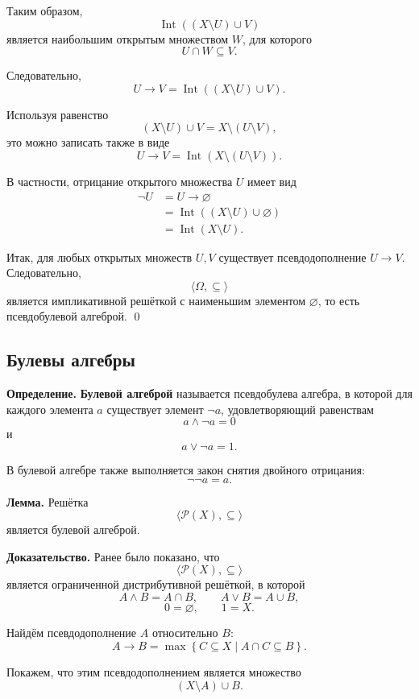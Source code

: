 \documentclass[12pt,a4paper,oneside,openany]{book}
\theoremstyle{definition}
\theoremstyle{plain}
\theoremstyle{remark}
\begin{document}
Таким образом,
\[
\operatorname{Int}
\left(
(X\setminus U)\cup V
\right)
\]
является наибольшим открытым множеством \(W\), для которого
\[
U\cap W\subseteq V.
\]

Следовательно,
\[
\boxed{
U\to V
=
\operatorname{Int}
\left(
(X\setminus U)\cup V
\right)
}.
\]

Используя равенство
\[
(X\setminus U)\cup V
=
X\setminus(U\setminus V),
\]
это можно записать также в виде
\[
U\to V
=
\operatorname{Int}
\left(
X\setminus(U\setminus V)
\right).
\]

В частности, отрицание открытого множества \(U\) имеет вид
\[
\begin{aligned}
\neg U
&=
U\to\varnothing
\\
&=
\operatorname{Int}
\left(
(X\setminus U)\cup\varnothing
\right)
\\
&=
\operatorname{Int}(X\setminus U).
\end{aligned}
\]

Итак, для любых открытых множеств \(U,V\) существует
псевдодополнение \(U\to V\). Следовательно,
\[
\langle\Omega,\subseteq\rangle
\]
является импликативной решёткой с наименьшим элементом
\(\varnothing\), то есть псевдобулевой алгеброй.
\qed



\subsection{Булевы алгебры}

\textbf{Определение.}
\textbf{Булевой алгеброй} называется псевдобулева алгебра, в которой для каждого элемента \(a\) существует элемент
\(\neg a\), удовлетворяющий равенствам
\[
a\wedge\neg a=0
\]
и
\[
a\vee\neg a=1.
\]


В булевой алгебре также выполняется закон снятия двойного отрицания:
\[
\neg\neg a=a.
\]

\textbf{Лемма.}
Решётка
\[
\langle\mathcal P(X),\subseteq\rangle
\]
является булевой алгеброй.

\textbf{Доказательство.}
Ранее было показано, что
\[
\langle\mathcal P(X),\subseteq\rangle
\]
является ограниченной дистрибутивной решёткой, в которой
\[
A\wedge B=A\cap B,
\qquad
A\vee B=A\cup B,
\]
\[
0=\varnothing,
\qquad
1=X.
\]

Найдём псевдодополнение \(A\) относительно \(B\):
\[
A\to B
=
\max
\left\{
C\subseteq X
\mathrel{}\middle|\mathrel{}
A\cap C\subseteq B
\right\}.
\]

Покажем, что этим псевдодополнением является множество
\[
(X\setminus A)\cup B.
\]
\end{document}
